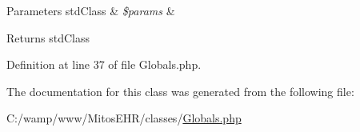 \begin{DoxyParams}[1]{\-Parameters}
std\-Class & {\em \$params} & \\
\hline
\end{DoxyParams}
\begin{DoxyReturn}{\-Returns}
std\-Class 
\end{DoxyReturn}


\-Definition at line 37 of file \-Globals.\-php.




\-The documentation for this class was generated from the following file\-:\begin{DoxyCompactItemize}
\item 
\-C\-:/wamp/www/\-Mitos\-E\-H\-R/classes/\hyperlink{_globals_8php}{\-Globals.\-php}\end{DoxyCompactItemize}
